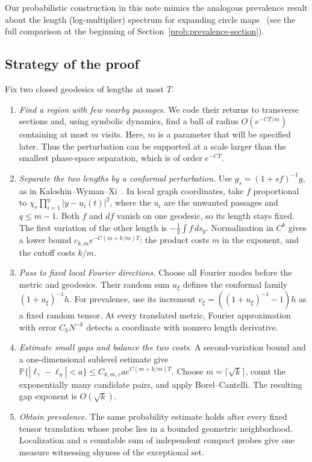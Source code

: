 \documentclass[10pt,oneside,reqno]{amsproc}
\numberwithin{equation}{section}
\theoremstyle{definition}
\theoremstyle{remark}
\newcommand{\eps}{\varepsilon}
\renewcommand{\le}{\leqslant}
\begin{document}
Our probabilistic construction in this note mimics the analogous prevalence result about the length (log-multiplier) spectrum for expanding circle maps~\cite[Appendix A]{DK} (see the full comparison at the beginning of Section~\ref{prob:prevalence-section}).

\subsection*{Strategy of the proof}

Fix two closed geodesics of lengths at most $T$. 
\begin{enumerate}
\item 
\emph{Find a region with few nearby passages.} 
We code their returns to transverse sections and, using symbolic dynamics, find a ball of radius $O(e^{-CT/m})$ containing at most $m$ visits. Here, $m$ is a parameter that will be specified later. Thus the perturbation can be supported at a scale larger than
the smallest phase-space separation, which is of order $e^{-CT}$.
\smallskip

\item 
\emph{Separate the two lengths by a conformal perturbation.}
Use $g_s=(1+sf)^{-1}g$, as in Kaloshin--Wyman--Xi~\cite[Section~3.2]{KWX}.
In local graph coordinates, take $f$ proportional to
$\chi_r\prod_{i=1}^q|y-u_i(t)|^2$, where the $u_i$ are the unwanted
passages and $q\le m-1$. Both $f$ and $df$ vanish on one geodesic, so
its length stays fixed. The first variation of the other length is
$-\tfrac12\int f\,ds_g$. Normalization in $C^k$ gives a lower bound
$c_{k,m}e^{-C(m+k/m)T}$: the product costs $m$ in the exponent, and
the cutoff costs $k/m$.
\smallskip

\item 
\emph{Pass to fixed local Fourier directions.}
Choose all Fourier modes before the metric and geodesics. Their random
sum $u_\xi$ defines the conformal family $(1+u_\xi)^{-1}h$. For
prevalence, use its increment $v_\xi=((1+u_\xi)^{-1}-1)h$ as a fixed
random tensor. At every translated metric, Fourier approximation with
error $C_kN^{-k}$ detects a coordinate with nonzero length derivative.
\smallskip

\item 
\emph{Estimate small gaps and balance the two costs.}
A second-variation bound and a one-dimensional sublevel estimate give
$\mathbb P\{|\ell_\gamma-\ell_\eta|<a\}\le
C_{k,m,\eps}a e^{C(m+k/m)T}$.
Choose $m=\lceil\sqrt{k}\rceil$, count the exponentially many candidate
pairs, and apply Borel--Cantelli. The resulting gap exponent is
$O(\sqrt{k})$.
\item \emph{Obtain prevalence.}
The same probability estimate holds after every fixed tensor translation
whose probe lies in a bounded geometric neighborhood. Localization and a
countable sum of independent compact probes give one measure witnessing
shyness of the exceptional set.
\end{enumerate}
\end{document}
